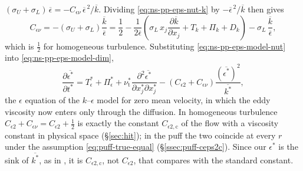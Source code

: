 \documentclass{article}
\begin{document}
$(\sigma_U + \sigma_L)\, \overline{\epsilon} = -C_{\epsilon\nu}\,
\overline{\epsilon}^{\,2}/\overline{k}$. Dividing \eqref{eq:ns-pp-eps-nut-k}
by $-\overline{\epsilon}^{\,2}/\overline{k}$ then gives
\begin{equation}\label{eq:ns-pp-eps-Cnu-local}
  C_{\epsilon\nu}
  = -\left( \sigma_U + \sigma_L \right) \frac{\overline{k}}{\overline{\epsilon}}
  = \frac12
  - \frac{1}{2\overline{\epsilon}} \left( \sigma_L\, x_j \frac{\partial \overline{k}}{\partial x_j}
  + T_k + \Pi_k + D_k \right)
  - \sigma_L\, \frac{\overline{k}}{\overline{\epsilon}} ,
\end{equation}
which is $\tfrac12$ for homogeneous turbulence. Substituting
\eqref{eq:ns-pp-eps-model-nut} into \eqref{eq:ns-pp-eps-model-dim},
\begin{equation}\label{eq:ns-pp-eps-model-dim-c}
  \frac{\partial \overline{\epsilon^*}}{\partial t^*}
  = T_\epsilon^* + \Pi_\epsilon^*
  + \nu_{\mathrm{t}}^* \frac{\partial^2 \overline{\epsilon^*}}{\partial x_j^* \partial x_j^*}
  - \left( C_{\epsilon 2} + C_{\epsilon\nu} \right) \frac{\left(\overline{\epsilon^*}\right)^2}{\overline{k^*}} ,
\end{equation}
the $\epsilon$ equation of the $k$--$\epsilon$ model for zero mean velocity,
in which the eddy viscosity now enters only through the diffusion. In
homogeneous turbulence $C_{\epsilon 2} + C_{\epsilon\nu} = C_{\epsilon 2} + \tfrac12$
is exactly the constant $C_{\epsilon 2,\mathrm{c}}$ of the flow with a
viscosity constant in physical space (\S\ref{sec:hit}); in the puff the two
coincide at every $r$ under the assumption \eqref{eq:puff-true-equal}
(\S\ref{ssec:puff-ceps2c}). Since our $\epsilon^*$ is the sink of
$\overline{k^*}$, as in \cite{pope2000turbulent}, it is
$C_{\epsilon 2,\mathrm{c}}$, not $C_{\epsilon 2}$, that compares with the
standard constant.
\end{document}
